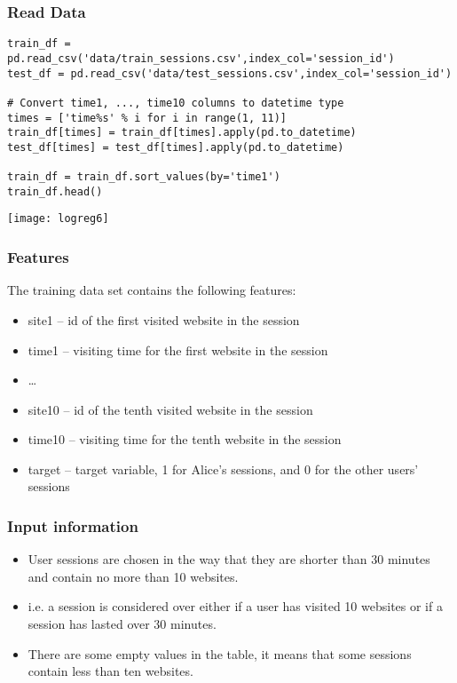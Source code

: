\begin{frame}[fragile]\frametitle{Read Data}	
\begin{lstlisting}
train_df = pd.read_csv('data/train_sessions.csv',index_col='session_id')
test_df = pd.read_csv('data/test_sessions.csv',index_col='session_id')

# Convert time1, ..., time10 columns to datetime type
times = ['time%s' % i for i in range(1, 11)]
train_df[times] = train_df[times].apply(pd.to_datetime)
test_df[times] = test_df[times].apply(pd.to_datetime)

train_df = train_df.sort_values(by='time1')
train_df.head() 
\end{lstlisting}
\begin{center}
\texttt{[image: logreg6]}
\end{center}
\end{frame}


\begin{frame}[fragile]\frametitle{Features}
The training data set contains the following features:
\begin{itemize}
\item site1 – id of the first visited website in the session
\item time1 – visiting time for the first website in the session
\item \ldots
\item site10 – id of the tenth visited website in the session
\item time10 – visiting time for the tenth website in the session
\item target – target variable, 1 for Alice's sessions, and 0 for the other users' sessions
\end{itemize}
\end{frame}

\begin{frame}[fragile]\frametitle{Input information}
\begin{itemize}
\item User sessions are chosen in the way that they are shorter than 30 minutes and contain no more than 10 websites. 
\item i.e. a session is considered over either if a user has visited 10 websites or if a session has lasted over 30 minutes.

\item There are some empty values in the table, it means that some sessions contain less than ten websites. 
\end{itemize}
\end{frame}

